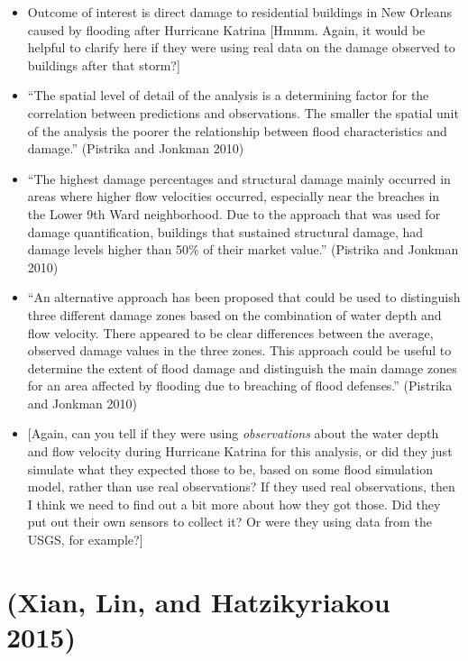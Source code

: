 \documentclass[
]{article}
\providecommand{\tightlist}{%
  \setlength{\itemsep}{0pt}\setlength{\parskip}{0pt}}
\begin{document}
\begin{itemize}
\tightlist
\item
  Outcome of interest is direct damage to residential buildings in New
  Orleans caused by flooding after Hurricane Katrina {[}Hmmm. Again, it
  would be helpful to clarify here if they were using real data on the
  damage observed to buildings after that storm?{]}
\item
  ``The spatial level of detail of the analysis is a determining factor
  for the correlation between predictions and observations. The smaller
  the spatial unit of the analysis the poorer the relationship between
  flood characteristics and damage.'' (Pistrika and Jonkman 2010)
\item
  ``The highest damage percentages and structural damage mainly occurred
  in areas where higher flow velocities occurred, especially near the
  breaches in the Lower 9th Ward neighborhood. Due to the approach that
  was used for damage quantification, buildings that sustained
  structural damage, had damage levels higher than 50\% of their market
  value.'' (Pistrika and Jonkman 2010)
\item
  ``An alternative approach has been proposed that could be used to
  distinguish three different damage zones based on the combination of
  water depth and flow velocity. There appeared to be clear differences
  between the average, observed damage values in the three zones. This
  approach could be useful to determine the extent of flood damage and
  distinguish the main damage zones for an area affected by flooding due
  to breaching of flood defenses.'' (Pistrika and Jonkman 2010)
\item
  {[}Again, can you tell if they were using \emph{observations} about
  the water depth and flow velocity during Hurricane Katrina for this
  analysis, or did they just simulate what they expected those to be,
  based on some flood simulation model, rather than use real
  observations? If they used real observations, then I think we need to
  find out a bit more about how they got those. Did they put out their
  own sensors to collect it? Or were they using data from the USGS, for
  example?{]}
\end{itemize}

\hypertarget{xian2015storm}{%
\section{(Xian, Lin, and Hatzikyriakou 2015)}\label{xian2015storm}}
\end{document}
